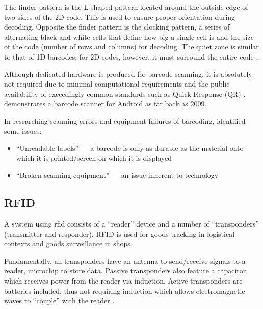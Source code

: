 \begin{displayquote} The finder pattern is the L-shaped
  pattern located around the outside edge of two sides of the
  2D code.
  This is used to ensure proper orientation during decoding.
  Opposite the finder pattern is the clocking pattern, a
  series of alternating black and white cells that define how
  big a single cell is and the size of the code (number of
  rows and columns) for decoding.
  The quiet zone is similar to that of 1D barcodes; for 2D
  codes, however, it must surround the entire code
  \parencite{whatIsABarcode}.
\end{displayquote}

Although dedicated hardware is produced for barcode
scanning, it is absolutely not required due to minimal
computational requirements and the public availability of
exceedingly common standards such as Quick Response (QR)
\parencite{qrCodeStandard}.
\cite{androidBarcodeScanner} demonstrates a barcode scanner
for Android as far back as 2009.

In researching scanning errors and equipment failures of
barcoding, \cite{barcodeRfidComparison} identified some
issues: 

\begin{itemize} 

  \item \enquote{Unreadable labels} --- a barcode is only as
        durable as the material onto which it is printed/screen on
        which it is displayed 

  \item \enquote{Broken scanning equipment} --- an issue
        inherent to technology 

\end{itemize} 

\subsection{RFID} \label{ss:rfid} 

A system using \gls{rfid} consists of a \enquote{reader}
device and a number of \enquote{transponders} (transmitter
and responder).
RFID is used for goods tracking in logistical contexts and
goods surveillance in shops \parencite{whatIsRfid}.

Fundamentally, all transponders have an antenna to
send/receive signals to a reader, microchip to store data.
Passive transponders also feature a capacitor, which
receives power from the reader via induction.
Active transponders are batteries-included, thus not
requiring induction which allows electromagnetic waves to
\enquote{couple} with the reader \parencite{whatIsRfid}.


